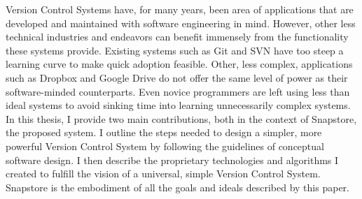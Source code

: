 % 
% 
%
Version Control Systems have, for many years, been area of applications that
are developed and maintained with software engineering in mind. However, other
less technical industries and endeavors can benefit immensely from the
functionality these systems provide. Existing systems such as Git and SVN have
too steep a learning curve to make quick adoption feasible. Other, less
complex, applications such as Dropbox and Google Drive do not offer the same
level of power as their software-minded counterparts. Even novice programmers
are left using less than ideal systems to avoid sinking time into learning
unnecessarily complex systems. In this thesis, I provide two main contributions,
both in the context of Snapstore, the proposed system. I outline the steps 
needed to design a simpler, more powerful Version Control System by following 
the guidelines of conceptual software design. I then describe the proprietary 
technologies and algorithms I created to fulfill the vision of a universal, 
simple Version Control System. Snapstore is the embodiment of all the goals 
and ideals described by this paper.
